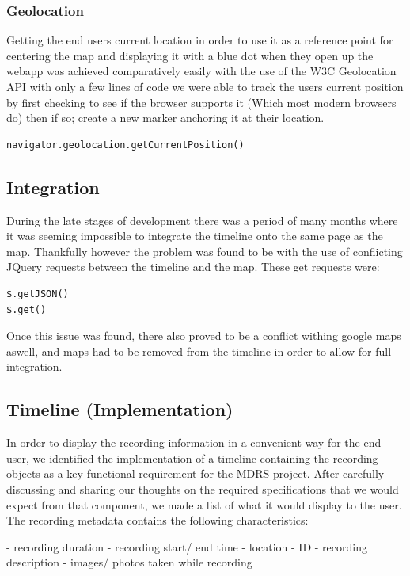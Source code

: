 \documentclass{l3proj}
\begin{document}
\subsubsection{Geolocation}

Getting the end users current location in order to use it as a
reference point for centering the map and displaying it with a blue
dot when they open up the webapp was achieved comparatively easily
with the use of the W3C Geolocation API with only a few lines of code
we were able to track the users current position by first checking to
see if the browser supports it (Which most modern browsers do) then if
so; create a new marker anchoring it at their location.
\begin{verbatim}
navigator.geolocation.getCurrentPosition()
\end{verbatim}

\subsection{Integration} 

During the late stages of development there was a period of many months
where it was seeming impossible to integrate the timeline onto the same
page as the map. Thankfully however the problem was found to be with the
use of conflicting JQuery requests between the timeline and the
map. These get requests were:
\begin{verbatim}
$.getJSON()
$.get()
\end{verbatim}
Once this issue was found, there also proved to be a conflict withing
google maps aswell, and maps had to be removed from the timeline in
order to allow for full integration.


\subsection{Timeline (Implementation)}

In order to display the recording information in a convenient way for the end user, we identified the implementation of a timeline containing the recording objects as a key functional requirement for the MDRS project. After carefully discussing and sharing our thoughts on the required specifications that we would expect from that component, we made a list of what it would display to the user. The recording metadata contains the following characteristics:

- recording duration
- recording start/ end time
- location
- ID
- recording description
- images/ photos taken while recording
\end{document}
